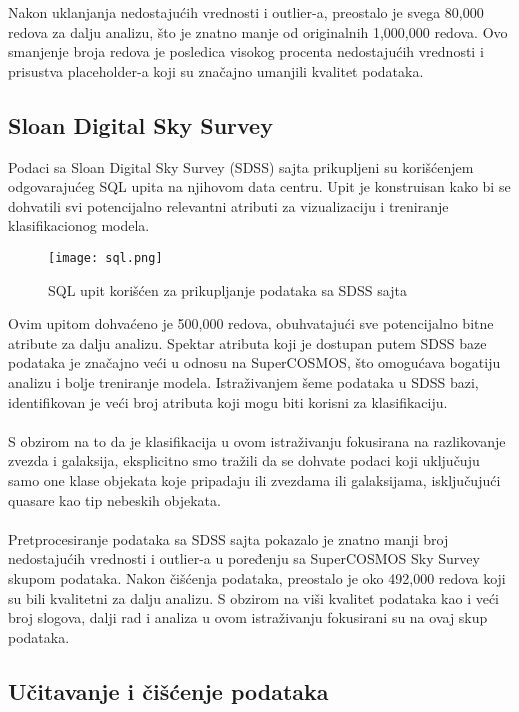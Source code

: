 \documentclass[a4paper,12pt]{article}
\begin{document}
Nakon uklanjanja nedostajućih vrednosti i outlier-a, preostalo je svega 80,000 redova za dalju analizu, što je znatno manje od originalnih 1,000,000 redova. Ovo smanjenje broja redova je posledica visokog procenta nedostajućih vrednosti i prisustva placeholder-a koji su značajno umanjili kvalitet podataka.

\subsection{Sloan Digital Sky Survey}
Podaci sa Sloan Digital Sky Survey (SDSS) sajta prikupljeni su korišćenjem odgovarajućeg SQL upita na njihovom data centru. Upit je konstruisan kako bi se dohvatili svi potencijalno relevantni atributi za vizualizaciju i treniranje klasifikacionog modela.

\begin{figure}[h!]
\centering
\texttt{[image: sql.png]}
\caption{SQL upit korišćen za prikupljanje podataka sa SDSS sajta}
\label{fig:sql_query}
\end{figure}

Ovim upitom dohvaćeno je 500,000 redova, obuhvatajući sve potencijalno bitne atribute za dalju analizu. Spektar atributa koji je dostupan putem SDSS baze podataka je značajno veći u odnosu na SuperCOSMOS, što omogućava bogatiju analizu i bolje treniranje modela. Istraživanjem šeme podataka u SDSS bazi, identifikovan je veći broj atributa koji mogu biti korisni za klasifikaciju.\\\\
S obzirom na to da je klasifikacija u ovom istraživanju fokusirana na razlikovanje zvezda i galaksija, eksplicitno smo tražili da se dohvate podaci koji uključuju samo one klase objekata koje pripadaju ili zvezdama ili galaksijama, isključujući quasare kao tip nebeskih objekata.\\\\
Pretprocesiranje podataka sa SDSS sajta pokazalo je znatno manji broj nedostajućih vrednosti i outlier-a u poređenju sa SuperCOSMOS Sky Survey skupom podataka. Nakon čišćenja podataka, preostalo je oko 492,000 redova koji su bili kvalitetni za dalju analizu. S obzirom na viši kvalitet podataka kao i veći broj slogova, dalji rad i analiza u ovom istraživanju fokusirani su na ovaj skup podataka.

\subsection{Učitavanje i čišćenje podataka}
\end{document}
